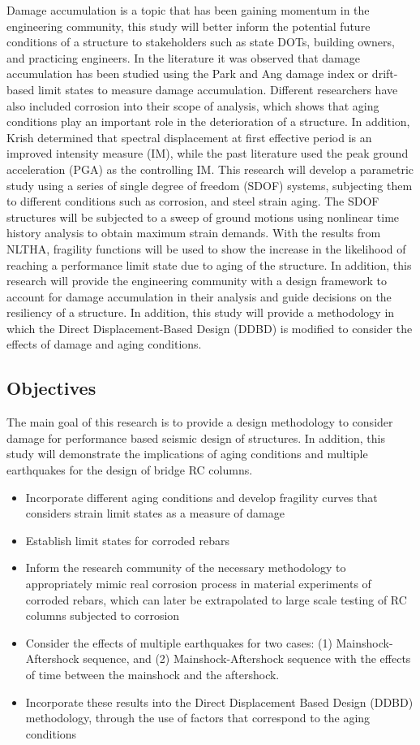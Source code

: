 Damage accumulation is a topic that has been gaining momentum in the engineering community, this study will better inform  the potential future conditions of a structure to stakeholders such as state DOTs, building owners, and practicing engineers. In the literature it was observed that damage accumulation has been studied using the Park and Ang damage index or drift-based limit states to measure damage accumulation. Different researchers have also included corrosion into their scope of analysis, which shows that aging conditions play an important role in the deterioration of a structure. In addition, Krish \cite{Krish2018} determined that spectral displacement at first effective period is an improved intensity measure (IM), while the past literature used the peak ground acceleration (PGA) as the controlling IM. This research will develop a parametric study using a series of single degree of freedom (SDOF) systems, subjecting them to different conditions such as corrosion, and steel strain aging. The SDOF structures will be subjected to a sweep of ground motions using nonlinear time history analysis to obtain maximum strain demands. With the results from NLTHA, fragility functions will be used to show the increase in the likelihood of reaching a performance limit state due to aging of the structure. In addition, this research will provide the engineering community with a design framework to account for damage accumulation in their analysis and guide decisions on the resiliency of a structure. In addition, this study will provide a methodology in which the Direct Displacement-Based Design (DDBD) is modified to consider the effects of damage and aging conditions.

\subsection{Objectives}
The main goal of this research is to provide a design methodology to consider damage for performance based seismic design of structures. In addition, this study will demonstrate the implications of aging conditions and multiple earthquakes for the design of bridge RC columns.


\begin{itemize}
	\item Incorporate different aging conditions and develop fragility curves that considers strain limit states as a measure of damage
	\item Establish limit states for corroded rebars
	\item Inform the research community of the necessary methodology to appropriately mimic real corrosion process in material experiments of corroded rebars, which can later be extrapolated to large scale testing of RC columns subjected to corrosion
	\item Consider the effects of multiple earthquakes for  two cases: (1) Mainshock-Aftershock sequence, and (2) Mainshock-Aftershock sequence with the effects of time between the mainshock and the aftershock.
	\item Incorporate these results into the Direct Displacement Based Design (DDBD) methodology, through the use of factors that correspond to the aging conditions
\end{itemize}